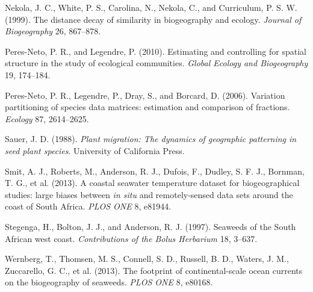 \documentclass[10pt,A4,]{article}
\begin{document}
\hypertarget{ref-Nekola1999}{}
Nekola, J. C., White, P. S., Carolina, N., Nekola, C., and Curriculum,
P. S. W. (1999). The distance decay of similarity in biogeography and
ecology. \emph{Journal of Biogeography} 26, 867--878.

\hypertarget{ref-PeresNeto2010}{}
Peres-Neto, P. R., and Legendre, P. (2010). Estimating and controlling
for spatial structure in the study of ecological communities.
\emph{Global Ecology and Biogeography} 19, 174--184.

\hypertarget{ref-Peres-Neto2006}{}
Peres-Neto, P. R., Legendre, P., Dray, S., and Borcard, D. (2006).
Variation partitioning of species data matrices: estimation and
comparison of fractions. \emph{Ecology} 87, 2614--2625.

\hypertarget{ref-Sauer1988}{}
Sauer, J. D. (1988). \emph{Plant migration: The dynamics of geographic
patterning in seed plant species}. University of California Press.

\hypertarget{ref-Smit2013}{}
Smit, A. J., Roberts, M., Anderson, R. J., Dufois, F., Dudley, S. F. J.,
Bornman, T. G., et al. (2013). A coastal seawater temperature dataset
for biogeographical studies: large biases between \emph{in situ} and
remotely-sensed data sets around the coast of South Africa. \emph{PLOS
ONE} 8, e81944.

\hypertarget{ref-Stegenga1997}{}
Stegenga, H., Bolton, J. J., and Anderson, R. J. (1997). Seaweeds of the
South African west coast. \emph{Contributions of the Bolus Herbarium}
18, 3--637.

\hypertarget{ref-Wernberg2013}{}
Wernberg, T., Thomsen, M. S., Connell, S. D., Russell, B. D., Waters, J.
M., Zuccarello, G. C., et al. (2013). The footprint of continental-scale
ocean currents on the biogeography of seaweeds. \emph{PLOS ONE} 8,
e80168.
\end{document}
